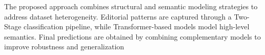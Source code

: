 The proposed approach combines structural and semantic modeling strategies to address dataset heterogeneity. Editorial patterns are captured through a Two-Stage classification pipeline, while Transformer-based models model high-level semantics. Final predictions are obtained by combining complementary models to improve robustness and generalization
